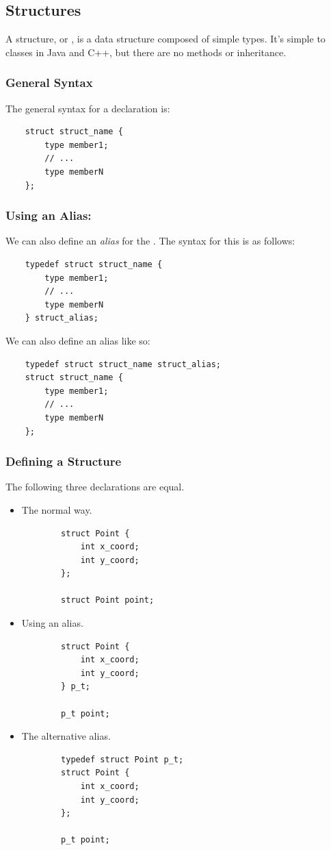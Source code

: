 \documentclass[letterpaper]{article}
\begin{document}
\subsection{Structures}
A structure, or , is a data structure composed of simple types. It's simple to classes in Java and C++, but there are no methods or inheritance. 

\subsubsection{General Syntax}
The general syntax for a  declaration is:
\begin{verbatim}
    struct struct_name {
        type member1;
        // ... 
        type memberN
    };
\end{verbatim}

\subsubsection{Using an Alias: }
We can also define an \emph{alias} for the . The syntax for this is as follows:
\begin{verbatim}
    typedef struct struct_name {
        type member1;
        // ... 
        type memberN
    } struct_alias; 
\end{verbatim}
We can also define an alias like so:
\begin{verbatim}
    typedef struct struct_name struct_alias; 
    struct struct_name {
        type member1;
        // ... 
        type memberN
    };
\end{verbatim}

\subsubsection{Defining a Structure}
The following three declarations are equal.
\begin{itemize}
    \item The normal way. 
    \begin{verbatim}
        struct Point {
            int x_coord;
            int y_coord;
        };

        struct Point point; 
    \end{verbatim}

    \item Using an alias.
    \begin{verbatim}
        struct Point {
            int x_coord; 
            int y_coord;
        } p_t;

        p_t point;
    \end{verbatim}
    
    \item The alternative alias. 
    \begin{verbatim}
        typedef struct Point p_t;
        struct Point {
            int x_coord; 
            int y_coord;
        };

        p_t point; 
    \end{verbatim}
\end{itemize}
\end{document}
